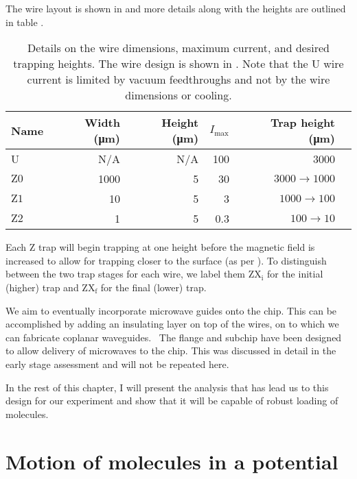 The wire layout is shown
in  and more details along with the
heights are outlined in table . 

\begin{table}
  \centering
\begin{tabular}{lrrrrr}
  Name & Width (\si{\micro\meter})& Height (\si{\micro\meter})& $I_\text{max}$ & Trap height (\si{\micro\meter}) \\
 \hline
  U & N/A& N/A& 100 & 3000\\
  $\mathrm{Z0}$ & 1000&  5& 30& $3000\rightarrow1000$ \\
  $\mathrm{Z1}$ & 10&  5& 3& $1000\rightarrow100$ \\
  $\mathrm{Z2}$ & 1&  5& 0.3& $100\rightarrow10$ \\
 \hline
\end{tabular}
  \caption{Details on the wire dimensions, maximum current, and desired
  trapping heights. The wire design is shown in
  . Note that the U wire current is
  limited by vacuum feedthroughs and not by the wire dimensions or cooling.
  }
  \label{design:table:wires}
\end{table}

Each Z trap will begin trapping at one height before the magnetic field is
increased to allow for trapping closer to the surface (as per ).
To distinguish between the two trap stages for each wire, we label them
$\mathrm{ZX_i}$ for the initial (higher) trap and $\mathrm{ZX_f}$ for the final
(lower) trap.

We aim to eventually incorporate microwave guides onto the chip. This can be
accomplished by adding an insulating layer on top of the wires, on to which we
can fabricate coplanar waveguides.~\cite{1127105} The flange and subchip have
been designed to allow delivery of microwaves to the chip.  This was discussed in detail in the early stage
assessment and will not be repeated here.

In the rest of this chapter, I will present the analysis that has lead us to
this design for our experiment and show that it will be capable of robust
loading of \CaF{} molecules.

\section{Motion of molecules in a potential}

